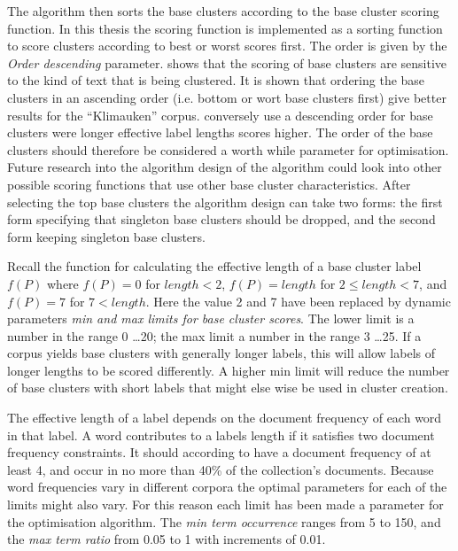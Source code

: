 The algorithm then sorts the base clusters according to the base cluster scoring function. In this thesis the scoring function is implemented as a sorting function to score clusters according to best or worst scores first. The order is given by the \emph{Order descending} parameter. \cite{Moe2014} shows that the scoring of base clusters are sensitive to the kind of text that is being clustered. It is shown that ordering the base clusters in an ascending order (i.e. bottom or wort base clusters first) give better results for the ``Klimauken'' corpus. \cite{Oren1998} conversely use a descending order for base clusters were longer effective label lengths scores higher. The order of the base clusters should therefore be considered a worth while parameter for optimisation. Future research into the algorithm design of the \CTC algorithm could look into other possible scoring functions that use other base cluster characteristics. After selecting the top base clusters the algorithm design can take two forms: the first form specifying that singleton base clusters should be dropped, and the second form keeping singleton base clusters.

Recall the function for calculating the effective length of a base cluster label \(f(P)\) where \(f(P) = 0\) for \(length < 2\), \(f(P) = length\) for \(2 \le length < 7\), and \(f(P) = 7\) for \(7 < length \). Here the value 2 and 7 have been replaced by dynamic parameters \emph{min and max limits for base cluster scores}. The lower limit is a number in the range 0 \dots 20; the max limit a number in the range 3 \dots 25. If a corpus yields base clusters with generally longer labels, this will allow labels of longer lengths to be scored differently. A higher min limit will reduce the number of base clusters with short labels that might else wise be used in cluster creation.

The effective length of a label depends on the document frequency of each word in that label. A word contributes to a labels length if it satisfies two document frequency constraints. It should according to \cite{Oren1998} have a document frequency of at least 4, and occur in no more than 40\% of the collection's documents. Because word frequencies vary in different corpora the optimal parameters for each of the limits might also vary. For this reason each limit has been made a parameter for the optimisation algorithm. The \emph{min term occurrence} ranges from 5 to 150, and the \emph{max term ratio} from 0.05 to 1 with increments of 0.01.

